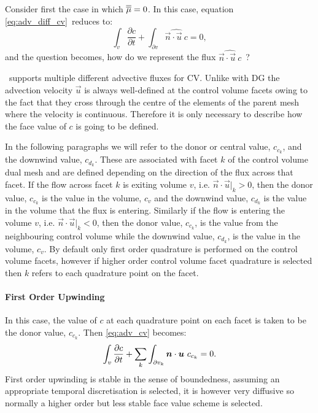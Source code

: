 Consider first the case in which $\overline{\overline{\mu}}=0$. In this case, equation \eqref{eq:adv_diff_cv}\ reduces to:
\begin{equation}\label{eq:adv_cv}
  \int_v \frac{\partial c}{\partial t} +
    \int_{\partial v} \widehat{\vec{n}\cdot\vec{u}~c}
    = 0,
\end{equation}
and the question becomes, how do we represent the flux $\widehat{\vec{n}\cdot\vec{u}~c}$\ ?

\fluidity\ supports multiple different advective fluxes for CV.  Unlike with DG the advection velocity $\vec{u}$ is always well-defined at the control volume facets owing to the fact that they cross through the centre of the elements of the parent mesh where the velocity is continuous.  Therefore it is only necessary to describe how the face value of $c$ is going to be defined.

In the following paragraphs we will refer to the donor or central value, $c_{c_k}$, and the downwind value, $c_{d_k}$.  These are associated with facet $k$ of the control volume dual mesh and are defined depending on the direction of the flux across that facet.  If the flow across facet $k$ is exiting volume $v$, i.e. $\vec{n}\cdot\vec{u}|_k>0$, then the donor value, $c_{c_k}$ is the value in the volume, $c_v$ and the downwind value, $c_{d_k}$ is the value in the volume that the flux is entering.  Similarly if the flow is entering the volume $v$, i.e. $\vec{n}\cdot\vec{u}|_k<0$, then the donor value, $c_{c_k}$, is the value from the neighbouring control volume while the downwind value, $c_{d_k}$, is the value in the volume, $c_v$.  By default only first order quadrature is performed on the control volume facets, however if higher order control volume facet quadrature is selected then $k$ refers to each quadrature point on the facet.

\paragraph{First Order Upwinding}

In this case, the value of $c$ at each quadrature point on each facet is taken to be the donor value, $c_{c_k}$.  Then \eqref{eq:adv_cv} becomes:
\begin{equation}
  \int_v \frac{\partial c}{\partial t} +
    \sum_k\int_{\partial v_k} {\mbox{\boldmath$n$}}\cdot{\mbox{\boldmath$u$}}~c_{c_k}
    = 0.
\end{equation}
First order upwinding is stable in the sense of boundedness, assuming an appropriate temporal discretisation is selected, it is however very diffusive so normally a higher order but less stable face value scheme is selected.

